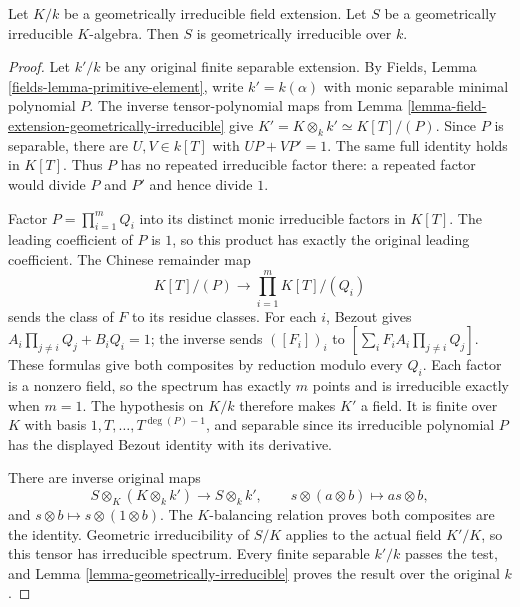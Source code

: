 \begin{lemma}
\label{lemma-geometrically-irreducible-transitive}
Let $K/k$ be a geometrically irreducible field extension.
Let $S$ be a geometrically irreducible $K$-algebra.
Then $S$ is geometrically irreducible over $k$.
\end{lemma}

\begin{proof}
Let $k'/k$ be any original finite
separable extension. By Fields,
Lemma \ref{fields-lemma-primitive-element},
write $k'=k(\alpha)$ with monic
separable minimal polynomial $P$.
The inverse tensor-polynomial maps
from Lemma
\ref{lemma-field-extension-geometrically-irreducible}
give $K'=K\otimes_k k'\simeq K[T]/(P)$.
Since $P$ is separable, there are
$U,V\in k[T]$ with $UP+VP'=1$.
The same full identity holds in
$K[T]$. Thus $P$ has no repeated
irreducible factor there: a repeated
factor would divide $P$ and $P'$
and hence divide $1$.

Factor $P=\prod_{i=1}^m Q_i$ into
its distinct monic irreducible
factors in $K[T]$. The leading
coefficient of $P$ is $1$, so this
product has exactly the original
leading coefficient. The Chinese
remainder map
$$
K[T]/(P)\longrightarrow\prod_{i=1}^m K[T]/(Q_i)
$$
sends the class of $F$ to its residue
classes. For each $i$, Bezout gives
$A_i\prod_{j\ne i}Q_j+B_iQ_i=1$;
the inverse sends $([F_i])_i$ to
$[\sum_i F_i A_i\prod_{j\ne i}Q_j]$.
These formulas give both composites
by reduction modulo every $Q_i$.
Each factor is a nonzero field,
so the spectrum has exactly $m$
points and is irreducible exactly
when $m=1$. The hypothesis on
$K/k$ therefore makes $K'$ a field.
It is finite over $K$ with basis
$1,T,\ldots,T^{\deg(P)-1}$, and
separable since its irreducible
polynomial $P$ has the displayed
Bezout identity with its derivative.

There are inverse original maps
$$
S\otimes_K(K\otimes_k k')\longrightarrow S\otimes_k k',
\qquad s\otimes(a\otimes b)\longmapsto as\otimes b,
$$
and $s\otimes b\mapsto s\otimes(1\otimes b)$.
The $K$-balancing relation proves
both composites are the identity.
Geometric irreducibility of $S/K$
applies to the actual field $K'/K$,
so this tensor has irreducible
spectrum. Every finite separable
$k'/k$ passes the test, and Lemma
\ref{lemma-geometrically-irreducible}
proves the result over the original $k$.
\end{proof}